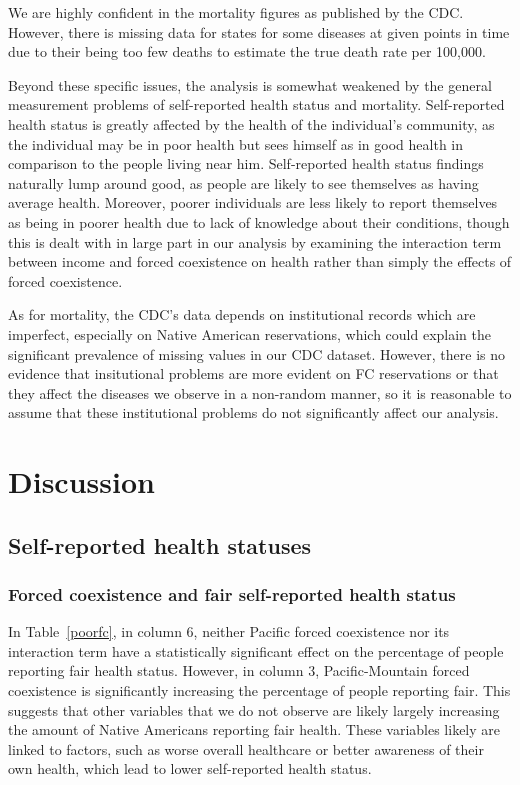 \documentclass[12pt]{article}
\begin{document}
We are highly confident in the mortality figures as published by the CDC.
However, there is missing data for states for some diseases at given points in time due to their being too few deaths to estimate the true death rate per 100,000.

Beyond these specific issues, the analysis is somewhat weakened by the general measurement problems of self-reported health status and mortality.
Self-reported health status is greatly affected by the health of the individual's community, as the individual may be in poor health but sees himself as in good health in comparison to the people living near him.  
Self-reported health status findings naturally lump around good, as people are likely to see themselves as having average health.
Moreover, poorer individuals are less likely to report themselves as being in poorer health due to lack of knowledge about their conditions, though this is dealt with in large part in our analysis by examining the interaction term between income and forced coexistence on health rather than simply the effects of forced coexistence.  

As for mortality, the CDC's data depends on institutional records which are imperfect, especially on Native American reservations, which could explain the significant prevalence of missing values in our CDC dataset.
However, there is no evidence that insitutional problems are more evident on FC reservations or that they affect the diseases we observe in a non-random manner, so it is reasonable to assume that these institutional problems do not significantly affect our analysis.


\section{Discussion}
\subsection{Self-reported health statuses}
\subsubsection{Forced coexistence and fair self-reported health status}
In Table~\ref{poorfc}, in column 6, neither Pacific forced coexistence nor its interaction term have a statistically significant effect on the percentage of people reporting fair health status.
However, in column 3, Pacific-Mountain forced coexistence is significantly increasing the percentage of people reporting fair.
This suggests that other variables that we do not observe are likely largely increasing the amount of Native Americans reporting fair health.
These variables likely are linked to factors, such as worse overall healthcare or better awareness of their own health, which lead to lower self-reported health status.
\end{document}
